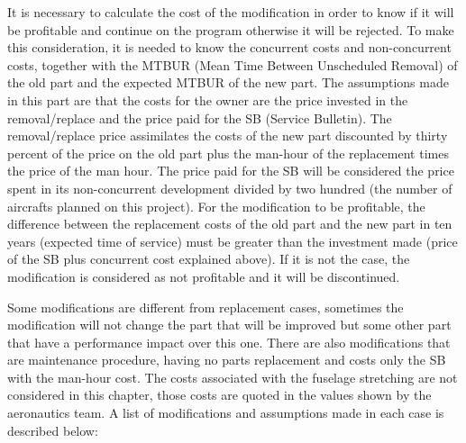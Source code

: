 ﻿It is necessary to calculate the cost of the modification in order to know if it will be profitable and continue on the program otherwise it will be rejected. To make this consideration, it is needed to know the concurrent costs and non-concurrent costs, together with the MTBUR (Mean Time Between Unscheduled Removal) of the old part and the expected MTBUR of the new part. The assumptions made in this part are that the costs for the owner are the price invested in the removal/replace and the price paid for the SB (Service Bulletin). The removal/replace price assimilates the costs of the new part discounted by thirty percent of the price on the old part plus the man-hour of the replacement times the price of the man hour. The price paid for the SB will be considered the price spent in its non-concurrent development divided by two hundred (the number of aircrafts planned on this project). For the modification to be profitable, the difference between the replacement costs of the old part and the new part in ten years (expected time of service) must be greater than the investment made (price of the SB plus concurrent cost explained above). If it is not the case, the modification is considered as not profitable and it will be discontinued.

Some modifications are different from replacement cases, sometimes the modification will not change the part that will be improved but some other part that have a performance impact over this one. There are also modifications that are maintenance procedure, having no parts replacement and costs only the SB with the man-hour cost.
The costs associated with the fuselage stretching are not considered in this chapter, those costs are quoted in the values shown by the aeronautics team.
A list of modifications and assumptions made in each case is described below:

